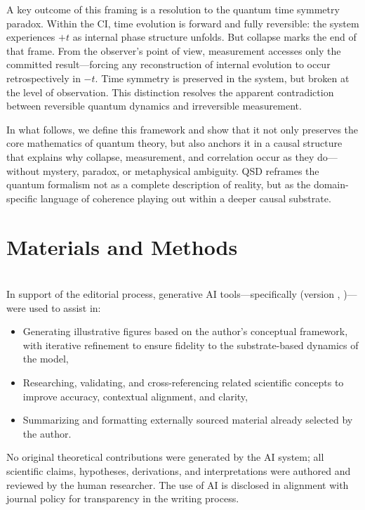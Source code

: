 \documentclass[entropy,article,submit,pdftex,moreauthors]{Definitions/mdpi}
\begin{document}
A key outcome of this framing is a resolution to the quantum time symmetry paradox. Within the CI, time evolution is forward and fully reversible: the system experiences \( +t \) as internal phase structure unfolds. But collapse marks the end of that frame. From the observer’s point of view, measurement accesses only the committed result—forcing any reconstruction of internal evolution to occur retrospectively in \( -t \). Time symmetry is preserved in the system, but broken at the level of observation. This distinction resolves the apparent contradiction between reversible quantum dynamics and irreversible measurement.

In what follows, we define this framework and show that it not only preserves the core mathematics of quantum theory, but also anchors it in a causal structure that explains why collapse, measurement, and correlation occur as they do—without mystery, paradox, or metaphysical ambiguity. QSD reframes the quantum formalism not as a complete description of reality, but as the domain-specific language of coherence playing out within a deeper causal substrate.



\section{Materials and Methods}
\qsdmethodstatement
\\
In support of the editorial process, generative AI tools—specifically \qsdgptname (version \qsdgptver, \qsdgptyear)—were used to assist in:
\begin{itemize}
    \item Generating illustrative figures based on the author’s conceptual framework, with iterative refinement to ensure fidelity to the substrate-based dynamics of the model,
    \item Researching, validating, and cross-referencing related scientific concepts to improve accuracy, contextual alignment, and clarity,
    \item Summarizing and formatting externally sourced material already selected by the author.
\end{itemize}

No original theoretical contributions were generated by the AI system; all scientific claims, hypotheses, derivations, and interpretations were authored and reviewed by the human researcher. The use of AI is disclosed in alignment with journal policy for transparency in the writing process.
\end{document}
